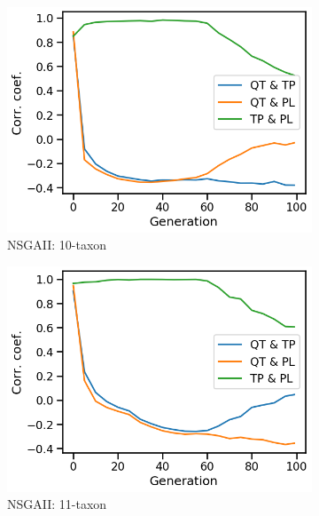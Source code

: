 \begin{figure}[!htbp]
	\centering
	\begin{adjustwidth}{-1cm}{-1cm}
		\begin{subfigure}[b]{0.4\textwidth}
			\includegraphics[width=\textwidth]{Figure/10-taxon_NSGAII_corr_plot}
			\caption{NSGAII: 10-taxon}
		\end{subfigure}%
		\begin{subfigure}[b]{0.4\textwidth}
			\includegraphics[width=\textwidth]{Figure/11-taxon_NSGAII_corr_plot}
			\caption{NSGAII: 11-taxon}
		\end{subfigure}%
		\begin{subfigure}[b]{0.4\textwidth}

\end{subfigure}
\end{adjustwidth}
\end{figure}
